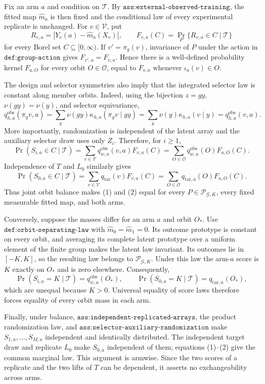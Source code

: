 Fix an arm \(a\) and condition on \(\mathcal T\). By \(\texttt{ass:external-observed-training}\), the fitted map \(\widehat m_a\) is then fixed and the conditional law of every experimental replicate is unchanged. For \(v\in\mathcal V\), put \[R_{v,a}=|Y_v(a)-\widehat m_a(X_v)|,\qquad F_{v,a}(C)=\Pr_P\{R_{v,a}\in C\mid\mathcal T\}\] for every Borel set \(C\subseteq[0,\infty)\). If \(v'=\pi_g(v)\), invariance of \(P\) under the action in \(\texttt{def:group-action}\) gives \(F_{v',a}=F_{v,a}\). Hence there is a well-defined probability kernel \(F_{a,O}\) for every orbit \(O\in\mathcal O\), equal to \(F_{v,a}\) whenever \(\iota_a(v)\in O\).

The design and selector symmetries also imply that the integrated selector law is constant along member orbits. Indeed, using the bijection \(z=gy\), \(\nu(gy)=\nu(y)\), and selector equivariance, \[q^{\mathrm{obs}}_{h,a}(\pi_gv,a)=\sum_y\nu(gy)\kappa_{h,a}(\pi_gv\mid gy)=\sum_y\nu(y)\kappa_{h,a}(v\mid y)=q^{\mathrm{obs}}_{h,a}(v,a).\] More importantly, randomization is independent of the latent array and the auxiliary selector draw uses only \(Z_i\). Therefore, for \(i\ge1\), \[\Pr(S_{i,a}\in C\mid\mathcal T)=\sum_{v\in\mathcal V}q^{\mathrm{obs}}_{w,a}(v,a)F_{v,a}(C)=\sum_{O\in\mathcal O}q^{\mathrm{obs}}_{w,a}(O)F_{a,O}(C).\tag{1}\] Independence of \(T\) and \(L_0\) similarly gives \[\Pr(S_{0,a}\in C\mid\mathcal T)=\sum_{v\in\mathcal V}q_{\mathrm{tar}}(v)F_{v,a}(C)=\sum_{O\in\mathcal O}q_{\mathrm{tar},a}(O)F_{a,O}(C).\tag{2}\] Thus joint orbit balance makes (1) and (2) equal for every \(P\in\mathcal P_{\mathcal G,K}\), every fixed measurable fitted map, and both arms.

Conversely, suppose the masses differ for an arm \(a\) and orbit \(O_*\). Use \(\texttt{def:orbit-separating-law}\) with \(\widehat m_0=\widehat m_1=0\). Its outcome prototype is constant on every orbit, and averaging its complete latent prototype over a uniform element of the finite group makes the latent law invariant. Its outcomes lie in \([-K,K]\), so the resulting law belongs to \(\mathcal P_{\mathcal G,K}\). Under this law the arm-\(a\) score is \(K\) exactly on \(O_*\) and is zero elsewhere. Consequently, \[\Pr(S_{i,a}=K\mid\mathcal T)=q^{\mathrm{obs}}_{w,a}(O_*),\qquad \Pr(S_{0,a}=K\mid\mathcal T)=q_{\mathrm{tar},a}(O_*),\] which are unequal because \(K>0\). Universal equality of score laws therefore forces equality of every orbit mass in each arm.

Finally, under balance, \(\texttt{ass:independent-replicated-arrays}\), the product randomization law, and \(\texttt{ass:selector-auxiliary-randomization}\) make \(S_{1,a},\ldots,S_{M,a}\) independent and identically distributed. The independent target draw and replicate \(L_0\) make \(S_{0,a}\) independent of them; equations (1)--(2) give the common marginal law. This argument is armwise. Since the two scores of a replicate and the two lifts of \(T\) can be dependent, it asserts no exchangeability across arms.